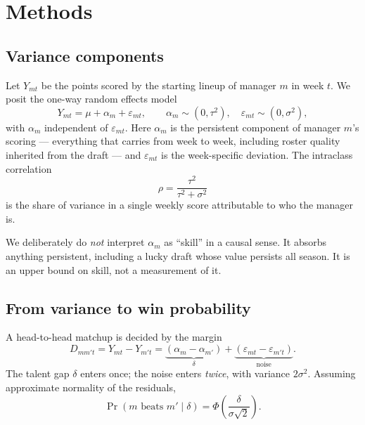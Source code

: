 \documentclass[11pt]{article}
\begin{document}
\section{Methods}

\subsection{Variance components}\label{sec:model}

Let $Y_{mt}$ be the points scored by the starting lineup of manager $m$ in week
$t$. We posit the one-way random effects model
\begin{equation}
Y_{mt} = \mu + \alpha_m + \varepsilon_{mt}, \qquad
\alpha_m \sim (0, \tau^2), \quad
\varepsilon_{mt} \sim (0, \sigma^2),
\label{eq:model}
\end{equation}
with $\alpha_m$ independent of $\varepsilon_{mt}$. Here $\alpha_m$ is the
persistent component of manager $m$'s scoring --- everything that carries from
week to week, including roster quality inherited from the draft --- and
$\varepsilon_{mt}$ is the week-specific deviation. The intraclass correlation
\begin{equation}
\rho = \frac{\tau^2}{\tau^2 + \sigma^2}
\end{equation}
is the share of variance in a single weekly score attributable to who the
manager is.

We deliberately do \emph{not} interpret $\alpha_m$ as ``skill'' in a causal
sense. It absorbs anything persistent, including a lucky draft whose value
persists all season. It is an upper bound on skill, not a measurement of it.

\subsection{From variance to win probability}\label{sec:winprob}

A head-to-head matchup is decided by the margin
\begin{equation}
D_{mm't} = Y_{mt} - Y_{m't}
= \underbrace{(\alpha_m - \alpha_{m'})}_{\textstyle \delta}
+ \underbrace{(\varepsilon_{mt} - \varepsilon_{m't})}_{\textstyle \text{noise}} .
\end{equation}
The talent gap $\delta$ enters once; the noise enters \emph{twice}, with
variance $2\sigma^2$. Assuming approximate normality of the residuals,
\begin{equation}
\Pr(m \text{ beats } m' \mid \delta)
= \Phi\!\left( \frac{\delta}{\sigma\sqrt{2}} \right).
\label{eq:pwin}
\end{equation}
\end{document}
